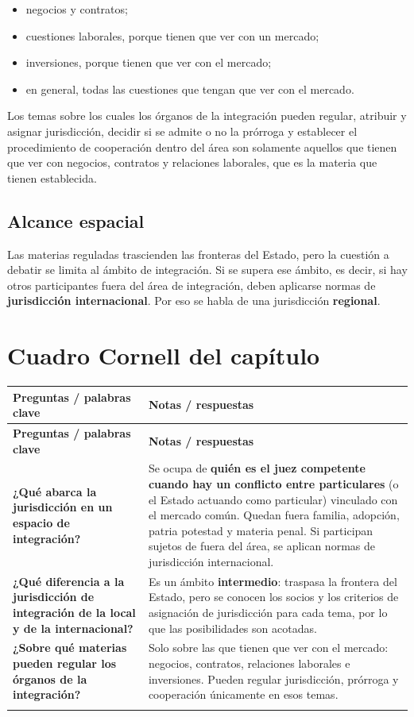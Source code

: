 \documentclass[12pt,oneside]{book}
\makeatletter
\newenvironment{cornell}{%
    \begin{longtable}{@{}>{\raggedright\arraybackslash}p{0.28\textwidth}>{\raggedright\arraybackslash}p{0.67\textwidth}@{}}
    \toprule
    \textbf{Preguntas / palabras clave} & \textbf{Notas / respuestas} \\
    \midrule
    \endfirsthead
    \toprule
    \textbf{Preguntas / palabras clave} & \textbf{Notas / respuestas} \\
    \midrule
    \endhead
}{%
    \end{longtable}
}
\newcommand{\cornellrow}[2]{\textbf{#1} & #2 \\[0.6em]}
\newcommand{\cornellresumen}[1]{%
    \midrule
    \multicolumn{2}{@{}p{\dimexpr0.95\textwidth+2\tabcolsep\relax}@{}}{\textbf{Resumen:} #1} \\
    \bottomrule
}
\makeatother
\begin{document}
\begin{itemize}
    \item negocios y contratos;
    \item cuestiones laborales, porque tienen que ver con un mercado;
    \item inversiones, porque tienen que ver con el mercado;
    \item en general, todas las cuestiones que tengan que ver con el mercado.
\end{itemize}

Los temas sobre los cuales los órganos de la integración pueden regular, atribuir y asignar jurisdicción, decidir si se admite o no la prórroga y establecer el procedimiento de cooperación dentro del área son solamente aquellos que tienen que ver con negocios, contratos y relaciones laborales, que es la materia que tienen establecida.

\subsection{Alcance espacial}

Las materias reguladas trascienden las fronteras del Estado, pero la cuestión a debatir se limita al ámbito de integración. Si se supera ese ámbito, es decir, si hay otros participantes fuera del área de integración, deben aplicarse normas de \textbf{jurisdicción internacional}. Por eso se habla de una jurisdicción \textbf{regional}.

\section{Cuadro Cornell del capítulo}

\begin{cornell}
\cornellrow{¿Qué abarca la jurisdicción en un espacio de integración?}{Se ocupa de \textbf{quién es el juez competente cuando hay un conflicto entre particulares} (o el Estado actuando como particular) vinculado con el mercado común. Quedan fuera familia, adopción, patria potestad y materia penal. Si participan sujetos de fuera del área, se aplican normas de jurisdicción internacional.}
\cornellrow{¿Qué diferencia a la jurisdicción de integración de la local y de la internacional?}{Es un ámbito \textbf{intermedio}: traspasa la frontera del Estado, pero se conocen los socios y los criterios de asignación de jurisdicción para cada tema, por lo que las posibilidades son acotadas.}
\cornellrow{¿Sobre qué materias pueden regular los órganos de la integración?}{Solo sobre las que tienen que ver con el mercado: negocios, contratos, relaciones laborales e inversiones. Pueden regular jurisdicción, prórroga y cooperación únicamente en esos temas.}
\cornellresumen{La jurisdicción en el espacio de integración responde a la pregunta de quién es competente, y para qué, en un conflicto entre particulares vinculado con las materias propias del mercado común. Es una jurisdicción regional e intermedia entre la local y la internacional, limitada a negocios, contratos, relaciones laborales e inversiones.}
\end{cornell}
\end{document}
